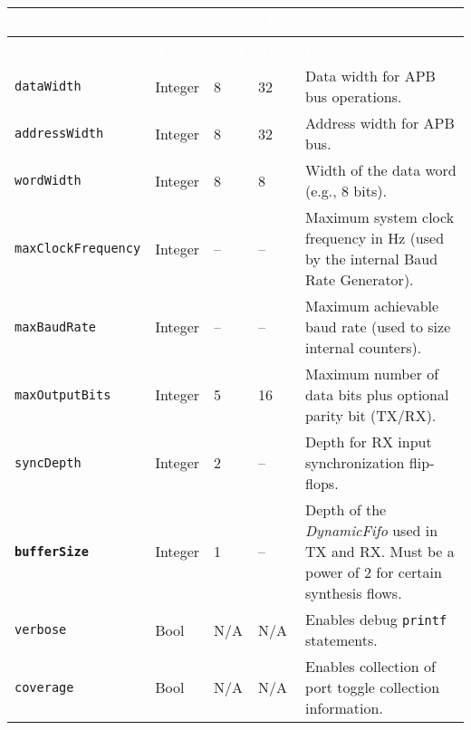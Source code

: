 \begin{longtable}[H]{
  | p{}
  | p{}
  | p{}
  | p{}
  | p{} |
}
\hline
\rowcolor{gray}
\textcolor{white}{\textbf{Name}} &
\textcolor{white}{\textbf{Type}} &
\textcolor{white}{\textbf{Min}} &
\textcolor{white}{\textbf{Max}} &
\textcolor{white}{\textbf{Description}} \\ 
\hline
\endfirsthead

\hline
\rowcolor{gray}
\textcolor{white}{\textbf{Name}} &
\textcolor{white}{\textbf{Type}} &
\textcolor{white}{\textbf{Min}} &
\textcolor{white}{\textbf{Max}} &
\textcolor{white}{\textbf{Description}} \\ 
\hline
\endhead

\hline
\endfoot

\texttt{dataWidth} &
Integer &
8 &
32 &
Data width for APB bus operations. \\ \hline

\texttt{addressWidth} &
Integer &
8 &
32 &
Address width for APB bus. \\ \hline

\texttt{wordWidth} &
Integer &
8 &
8 &
Width of the data word (e.g., 8 bits). \\ \hline

\texttt{maxClockFrequency} &
Integer &
-- &
-- &
Maximum system clock frequency in Hz (used by the internal Baud Rate Generator). \\ \hline

\texttt{maxBaudRate} &
Integer &
-- &
-- &
Maximum achievable baud rate (used to size internal counters). \\ \hline

\texttt{maxOutputBits} &
Integer &
5 &
16 &
Maximum number of data bits plus optional parity bit (TX/RX). \\ \hline

\texttt{syncDepth} &
Integer &
2 &
-- &
Depth for RX input synchronization flip‐flops. \\ \hline

\textbf{\texttt{bufferSize}} &
Integer &
1 &
-- &
Depth of the \textit{DynamicFifo} used in TX and RX. Must be a power of 2 for certain synthesis flows. \\ \hline

\texttt{verbose} &
Bool &
N/A &
N/A &
Enables debug \texttt{printf} statements. \\ \hline

\texttt{coverage} &
Bool &
N/A &
N/A &
Enables collection of port toggle collection information. \\ \hline

\end{longtable}
\label{table:uart_params}
\endgroup


